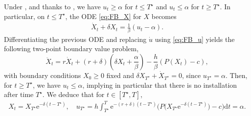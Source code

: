 \documentclass[12pt]{article}
\def\erm{\mathrm{e}}
\def\drm{\mathrm{d}}
\begin{document}
Under , and thanks to , we have $u_t\geq\alpha$ for $t\leq {T^\star}$ and $u_t\leq\alpha$ for $t\geq {T^\star}$. In particular, on $t\leq {T^\star }$, the ODE \eqref{eq:FB_X} for $X$ becomes
\begin{align*}
\dot{X}_t+\delta X_t=\frac{1}{\beta}(u_t-\alpha). 
\end{align*}
Differentiating the previous ODE and replacing $\dot{u}$ using \eqref{eq:FB_u} yields the following two-point boundary value problem,
\begin{equation}
\ddot{X}_t=r\dot{X}_t+(r+\delta)\left(\delta X_t+\frac{\alpha}{\beta}\right)-\frac{h}{\beta}\left(P(X_t)-c\right),\label{Xdoubledot}
\end{equation}
with boundary conditions $X_0 \geq 0$ fixed and $\delta X_{T^\star }+\dot{X}_{T^\star }=0$, since $u_{T^\star} = \alpha$.
Then, for $t\geq {T^\star}$, we have $u_t\leq\alpha$, implying in particular that there is no installation after time $T^\star$. We deduce that for $t \in [T^\star,T]$,
\begin{align*}
    X_t=X_{T^\star }  \erm^{-\delta(t-{T^\star })}, \quad u_{T^\star }= h \int_{T^\star }^{T} \erm^{-(r+\delta)(t-{T^\star })} \big(P \big(X_{T^\star } \erm^{-\delta(t-{T^\star })} \big)-c\big) \drm t = \alpha.
\end{align*}
\end{document}
